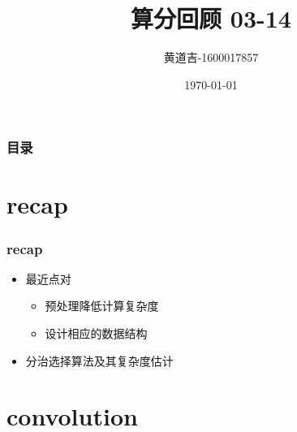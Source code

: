 \documentclass[cjk]{beamer}
\begin{document}
\begin{CJK*}{UTF8}{gbsn}
\title{算分回顾 03-14}
\author{黄道吉-1600017857}
\date{\today}

\begin{frame}
    \titlepage
\end{frame}

\begin{frame}
    \frametitle{目录}
    \tableofcontents
\end{frame}

\section{recap}
  \begin{frame}
    \frametitle{recap}
    \begin{itemize}
      \item 最近点对
        \begin{itemize}
          \item 预处理降低计算复杂度
          \item 设计相应的数据结构
        \end{itemize}
      \item 分治选择算法及其复杂度估计
    \end{itemize}
  \end{frame}

\section{convolution}

\end{CJK*}
\end{document}
